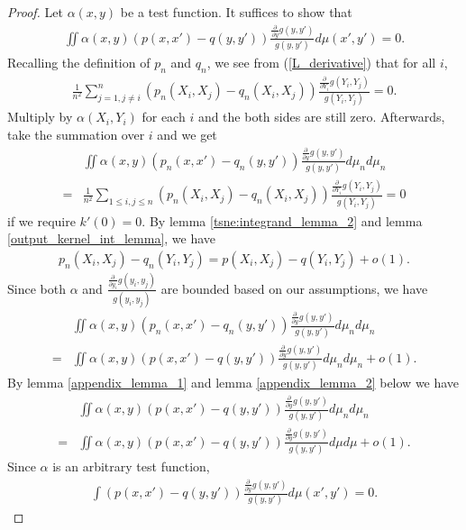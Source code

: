 \begin{proof}
    Let $\alpha(x,y)$ be a test function. It suffices to show that
    \begin{align}
        \iint \alpha(x,y)(p(x,x')-q(y,y')) \frac{\frac{\partial}{\partial y}g(y,y')}{g(y,y')} d\mu(x',y') = 0.
    \end{align}
    Recalling the definition of $p_n$ and $q_n$, we see from (\ref{L_derivative}) that for all $i$,
    \begin{align}
        \frac{1}{n^2}\sum_{j=1,j \neq i}^n (p_n(X_i,X_j)-q_n(X_i,X_j)) \frac{\frac{\partial}{\partial Y_i}g(Y_i,Y_j)}{g(Y_i,Y_j)} = 0.
    \end{align}
    Multiply by $\alpha(X_i,Y_i)$ for each $i$ and the both sides are still zero. Afterwards, take the summation over $i$ and we get
    \begin{align}
          & \iint \alpha(x,y)(p_n(x,x')-q_n(y,y')) \frac{\frac{\partial}{\partial y}g(y,y')}{g(y,y')} d\mu_n d\mu_n \nonumber                \\
        = & \frac{1}{n^2}\sum_{1 \leq i,j \leq n} (p_n(X_i,X_j)-q_n(X_i,X_j)) \frac{\frac{\partial}{\partial Y_i}g(Y_i,Y_j)}{g(Y_i,Y_j)} = 0
    \end{align}
    if we require $k'(0) = 0$.
    By lemma \ref{tsne:integrand_lemma_2} and lemma \ref{output_kernel_int_lemma}, we have
    \begin{align}
        p_n(X_i,X_j)-q_n(Y_i,Y_j) = p(X_i,X_j)-q(Y_i,Y_j) + o(1).
    \end{align}
    Since both $\alpha$ and $\frac{\frac{\partial}{\partial y_i}g(y_i,y_j)}{g(y_i,y_j)}$ are bounded based on our assumptions, we have
    \begin{align}
          & \iint \alpha(x,y)(p_n(x,x')-q_n(y,y')) \frac{\frac{\partial}{\partial y}g(y,y')}{g(y,y')} d\mu_n d\mu_n \nonumber \\
        = & \iint \alpha(x,y)(p(x,x')-q(y,y')) \frac{\frac{\partial}{\partial y}g(y,y')}{g(y,y')} d\mu_n d\mu_n + o(1).
    \end{align}
    By lemma \ref{appendix_lemma_1} and lemma \ref{appendix_lemma_2} below we have
    \begin{align}
          & \iint \alpha(x,y)(p(x,x')-q(y,y')) \frac{\frac{\partial}{\partial y}g(y,y')}{g(y,y')} d\mu_n d\mu_n \nonumber \\
        = & \iint \alpha(x,y)(p(x,x')-q(y,y')) \frac{\frac{\partial}{\partial y}g(y,y')}{g(y,y')} d\mu d\mu + o(1).
    \end{align}
    Since $\alpha$ is an arbitrary test function,
    \begin{align}
        \int (p(x,x')-q(y,y')) \frac{\frac{\partial}{\partial y}g(y,y')}{g(y,y')} d\mu(x',y') = 0.
    \end{align}
\end{proof}

